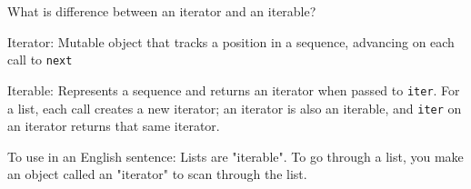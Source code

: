 \begin{blocksection}
\question What is difference between an iterator and an iterable?

\begin{solution}[0.5in]
Iterator: Mutable object that tracks a position in a sequence, advancing on each call to \lstinline$next$

Iterable: Represents a sequence and returns an iterator when passed to \lstinline$iter$. For a list, each call creates a new iterator; an iterator is also an iterable, and \lstinline$iter$ on an iterator returns that same iterator.

To use in an English sentence:
Lists are "iterable". To go through a list, you make an object called an "iterator" to scan through the list.
\end{solution}
\end{blocksection}
